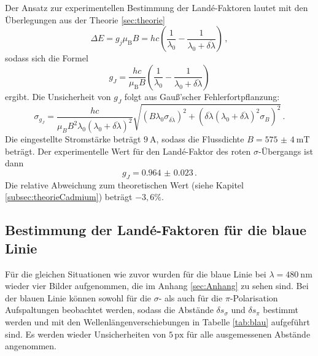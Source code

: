 Der Ansatz zur experimentellen Bestimmung der Landé-Faktoren lautet mit den Überlegungen aus der Theorie \ref{sec:theorie}
\begin{equation*}
  \Delta E = g_j \mu_\text{B} B = hc \left (\frac{1}{\lambda_0} - \frac{1}{\lambda_0+\overline{\delta \lambda}}\right)\,,
\end{equation*}
sodass sich die Formel
\begin{equation}
  g_J = \frac{hc}{\mu_\text{B} B} \left (\frac{1}{\lambda_0} - \frac{1}{\lambda_0+\overline{\delta \lambda}}\right)
  \label{eqn:g_J_auswertung}
\end{equation}
ergibt.
Die Unsicherheit von $g_J$ folgt aus Gauß'scher Fehlerfortpflanzung:
\begin{equation}
  \sigma_{g_J} = \frac{hc}{\mu_B B^2 \lambda_0 (\lambda_0+\overline{\delta \lambda})^2}
  \sqrt{(B \lambda_0 \sigma_{\overline{\delta \lambda}})^2 + (\overline{\delta \lambda}(\lambda_0 + \overline{\delta \lambda})^2 \sigma_B)^2}\,.
\end{equation}
Die eingestellte Stromstärke beträgt $\SI{9}{\ampere}$, sodass die Flussdichte $B = \SI{575(4)}{\milli\tesla}$ beträgt.
Der experimentelle Wert für den Landé-Faktor des roten $\sigma$-Übergangs ist dann
\begin{equation*}
  g_J = \num{0.964(23)}\,.
\end{equation*}
Die relative Abweichung zum theoretischen Wert (siehe Kapitel \ref{subsec:theorieCadmium}) beträgt $-3{,}6\%$.

\subsection{Bestimmung der Landé-Faktoren für die blaue Linie}

Für die gleichen Situationen wie zuvor wurden für die blaue Linie bei $\lambda=\SI{480}{\nano\meter}$ wieder vier Bilder aufgenommen, die im Anhang \ref{sec:Anhang} zu sehen sind.
Bei der blauen Linie können sowohl für die $\sigma$- als auch für die $\pi$-Polarisation Aufspaltungen beobachtet werden, sodass die Abstände ${\delta s}_\sigma$ und ${\delta s}_\pi$ bestimmt werden und mit den Wellenlängenverschiebungen in Tabelle \ref{tab:blau} aufgeführt sind. Es werden wieder Unsicherheiten von $5\,\text{px}$ für alle ausgemessenen Abstände angenommen.

